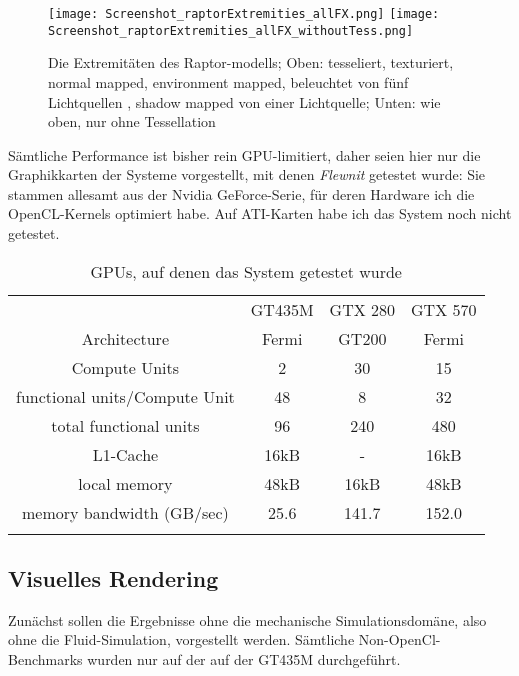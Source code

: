 
\label{sec:ergebnisse}

\begin{figure}[!h]

	\texttt{[image: Screenshot\_raptorExtremities\_allFX.png]} 
	\texttt{[image: Screenshot\_raptorExtremities\_allFX\_withoutTess.png]}

	\caption{Die Extremitäten des Raptor-modells; Oben: tesseliert, texturiert, normal mapped, environment mapped, 
	beleuchtet von fünf Lichtquellen , shadow mapped von einer Lichtquelle; Unten: wie oben, nur ohne Tessellation
	}
	\label{fig:raptorExtremitiesTessVSNonTess}
\end{figure}

Sämtliche Performance ist bisher rein GPU-limitiert, daher seien hier nur die
Graphikkarten der Systeme vorgestellt, mit denen \emph{Flewnit} getestet wurde: Sie stammen allesamt aus der 
Nvidia GeForce-Serie, für deren Hardware ich die OpenCL-Kernels optimiert habe. Auf ATI-Karten habe ich das
System noch nicht getestet.

\begin{table}[ht]
\begin{tabular}{|c|c|c|c|}
	\noalign{\hrule}
	& GT435M  & GTX 280 & GTX 570 \\
	\noalign{\hrule}
	Architecture &	Fermi & GT200 & Fermi \\
	\noalign{\hrule}
	Compute Units & 2 & 30 & 15 \\
	\noalign{\hrule}
	functional units/Compute Unit & 48 & 8 & 32 \\
	\noalign{\hrule}
	total functional units & 96 & 240 & 480 \\
	\noalign{\hrule}
	L1-Cache & 16kB & -	& 16kB	\\
	\noalign{\hrule}
	local memory & 48kB & 16kB & 48kB \\
	\noalign{\hrule}
	memory bandwidth (GB/sec) & 25.6 &  141.7 & 152.0 \\
	\noalign{\hrule}
\end{tabular}
\caption{GPUs, auf denen das System getestet wurde}
\label{tab:GPUs}
\end{table}



\subsection{Visuelles Rendering}


	Zunächst sollen die Ergebnisse ohne die mechanische Simulationsdomäne, also ohne die Fluid-Simulation,
	vorgestellt werden.
	Sämtliche Non-OpenCl- Benchmarks wurden nur auf der auf der GT435M durchgeführt.
	
